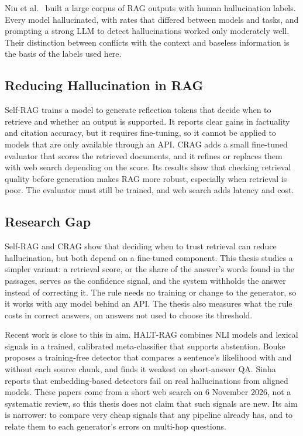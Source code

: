 Niu et al.\ \cite{niu2024ragtruth} built a large corpus of RAG outputs with human hallucination
labels. Every model hallucinated, with rates that differed between models and tasks, and prompting
a strong LLM to detect hallucinations worked only moderately well. Their distinction between
conflicts with the context and baseless information is the basis of the labels used here.

\subsection{Reducing Hallucination in RAG}
Self-RAG \cite{asai2024selfrag} trains a model to generate reflection tokens that decide when to
retrieve and whether an output is supported. It reports clear gains in factuality and citation
accuracy, but it requires fine-tuning, so it cannot be applied to models that are only available
through an API. CRAG \cite{yan2024crag} adds a small fine-tuned evaluator that scores the retrieved
documents, and it refines or replaces them with web search depending on the score. Its results show
that checking retrieval quality before generation makes RAG more robust, especially when retrieval
is poor. The evaluator must still be trained, and web search adds latency and cost.

\subsection{Research Gap}
Self-RAG and CRAG show that deciding when to trust retrieval can reduce hallucination, but both
depend on a fine-tuned component. This thesis studies a simpler variant: a retrieval score, or the
share of the answer's words found in the passages, serves as the confidence signal, and the system
withholds the answer instead of correcting it. The rule needs no training or change to the generator,
so it works with any model behind an API. The thesis also measures what the rule costs in correct
answers, on answers not used to choose its threshold.

Recent work is close to this in aim. HALT-RAG \cite{goswami2025halt} combines NLI models and lexical
signals in a trained, calibrated meta-classifier that supports abstention. Bouke \cite{bouke2026context}
proposes a training-free detector that compares a sentence's likelihood with and without each source
chunk, and finds it weakest on short-answer QA. Sinha \cite{sinha2025semantic} reports that
embedding-based detectors fail on real hallucinations from aligned models. These papers come from a
short web search on 6 November 2026, not a systematic review, so this thesis does not claim that such
signals are new. Its aim is narrower: to compare very cheap signals that any pipeline already has, and
to relate them to each generator's errors on multi-hop questions.
